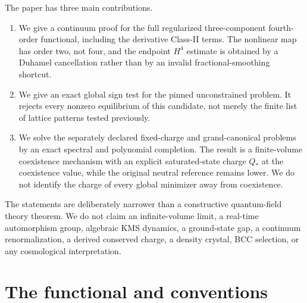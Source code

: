 \documentclass[11pt]{article}
\numberwithin{equation}{section}
\theoremstyle{definition}
\begin{document}
The paper has three main contributions.
\begin{enumerate}[label=(\roman*)]
\item We give a continuum proof for the full regularized three-component
      fourth-order functional, including the derivative Class-II terms.  The
      nonlinear map has order two, not four, and the endpoint $H^4$ estimate
      is obtained by a Duhamel cancellation rather than by an invalid
      fractional-smoothing shortcut.
\item We give an exact global sign test for the pinned unconstrained problem.
      It rejects every nonzero equilibrium of this candidate, not merely the
      finite list of lattice patterns tested previously.
\item We solve the separately declared fixed-charge and grand-canonical
      problems by an exact spectral and polynomial completion.  The result is
      a finite-volume coexistence mechanism with an explicit saturated-state
      charge $Q_*$ at the coexistence value, while the original neutral
      reference remains lower.  We do not identify the charge of every global
      minimizer away from coexistence.
\end{enumerate}

The statements are deliberately narrower than a constructive quantum-field
theory theorem.  We do not claim an infinite-volume limit, a real-time
automorphism group, algebraic KMS dynamics, a ground-state gap, a continuum
renormalization, a derived conserved charge, a density crystal, BCC selection,
or any cosmological interpretation.

\section{The functional and conventions}
\end{document}
